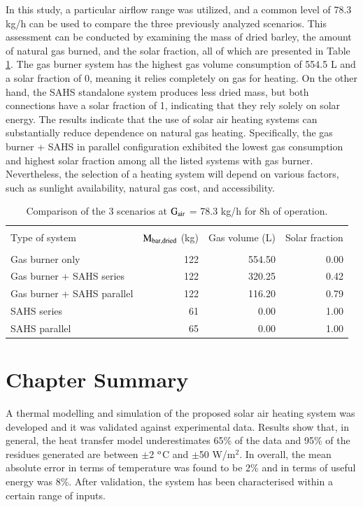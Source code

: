 In this study, a particular airflow range was utilized, and a common level of 78.3 kg/h can be used to compare the three previously analyzed scenarios. This assessment can be conducted by examining the mass of dried barley, the amount of natural gas burned, and the solar fraction, all of which are presented in Table \ref{scenario-comparison}.  The gas burner system has the highest gas volume consumption of 554.5 L and a solar fraction of 0, meaning it relies completely on gas for heating. On the other hand, the SAHS standalone system produces less dried mass, but both connections have a solar fraction of 1, indicating that they rely solely on solar energy. The results indicate that the use of solar air heating systems can substantially reduce dependence on natural gas heating. Specifically, the gas burner + SAHS in parallel configuration exhibited the lowest gas consumption and highest solar fraction among all the listed systems with gas burner. Nevertheless, the selection of a heating system will depend on various factors, such as sunlight availability, natural gas cost, and accessibility.

\begin{table}[h]
	\caption{Comparison of the 3 scenarios at $\rm{G_{air}}$ = 78.3 kg/h for 8h of operation. }
	\centering
	
	\begin{tabular}{lrrr}
		\hline \\ [-10pt]
		Type of system & $\rm{M_{bar,dried}}$ (kg) & Gas volume (L) & Solar fraction \\
		\hline \\ [-10pt]
		Gas burner only & 122 & 554.50 & 0.00 \\ [2pt]
		Gas burner + SAHS series & 122 & 320.25 & 0.42 \\ [2pt]
		Gas burner + SAHS parallel & 122 & 116.20 & 0.79 \\ [2pt]
		SAHS series & 61 & 0.00 & 1.00 \\ [2pt] 
		SAHS parallel & 65 & 0.00 & 1.00 \\
		\hline
	\end{tabular}
	
	\label{scenario-comparison}
\end{table}

\section{Chapter Summary}

A thermal modelling and simulation of the proposed solar air heating system was developed and it was validated against experimental data. Results show that, in general, the heat transfer model underestimates 65\% of the data and 95\% of the residues generated are between $\pm$2 $^{\rm{o}}$C and $\pm$50 W/m$^2$. In overall, the mean absolute error in terms of temperature was found to be 2\% and in terms of useful energy was 8\%. After validation, the system has been characterised within a certain range of inputs.

